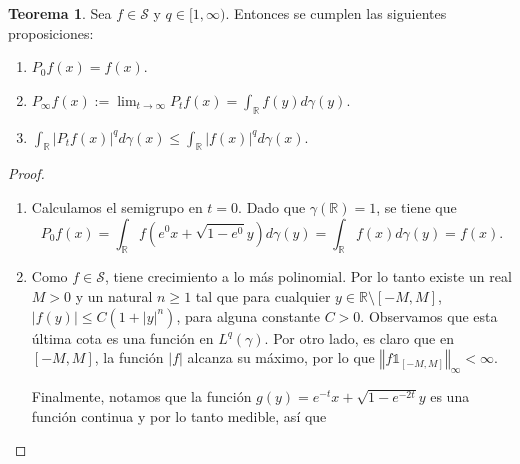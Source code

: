 \documentclass[letterpaper,twoside,12pt]{book}
\newcommand{\R}{\mathbb{R}}
\renewcommand{\S}{\mathcal{S}}
\newcommand{\1}{\mathds{1}}
\newcommand{\abs}[1]{\left\lvert #1 \right\rvert}
\renewcommand{\to}{\rightarrow}
\newcommand{\norm}[1]{\left\Vert #1 \right\Vert}
\theoremstyle{definition}
\theoremstyle{definition}
\newtheorem{teo}{Teorema}
\theoremstyle{remark}
\theoremstyle{definition}
\theoremstyle{definition}
\theoremstyle{definition}
\theoremstyle{definition}
\theoremstyle{definition}
\begin{document}
\begin{teo}
   Sea $f\in \mathcal{S}$ y $q\in [1,\infty)$. Entonces se cumplen las siguientes proposiciones:
   \begin{enumerate}
       \item $P_0f(x)=f(x)$.
       \item $P_\infty f(x):=\displaystyle\lim_{t\to\infty}P_tf(x)=\int_\R f(y)d\gamma(y)$.
       \item $\displaystyle\int_\R \abs{P_tf(x)}^qd\gamma(x)\leq \int_\R\abs{f(x)}^qd\gamma(x)$.
   \end{enumerate}
\end{teo}
\begin{proof} 
  \begin{enumerate}
   \item  Calculamos el semigrupo en $t=0$. Dado que $\gamma(\R)=1$, se tiene que 
    \[
    P_0f(x)=\int_\R f\left(e^{0}x+\sqrt{1-e^{0}}y\right)d\gamma(y)=\int_\R f(x)d\gamma(y)=f(x).
    \]
    \item Como $f\in \S$, tiene crecimiento a lo más polinomial. Por lo tanto existe un real $M>0$ y un natural $n\geq1$ tal que para cualquier $y\in \R\setminus[-M,M]$, $|f(y)|\leq C(1+|y|^n)$, para alguna constante $C>0$. Observamos que esta última cota es una función en $L^q(\gamma)$. Por otro lado, es claro que en $[-M,M]$, la función $|f|$ alcanza su máximo, por lo que $\norm{f\1_{[-M,M]}}_\infty<\infty$. 
    
    Finalmente, notamos que la función $g(y)=e^{-t}x+\sqrt{1-e^{-2t}}y$ es una función continua y por lo tanto medible, así que
    

\end{enumerate}
\end{proof}
\end{document}
